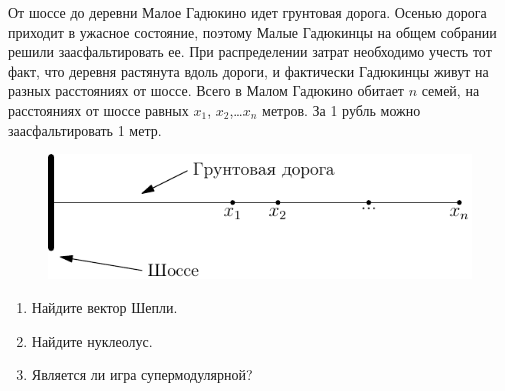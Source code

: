 \begin{problem}
От шоссе до деревни Малое Гадюкино идет грунтовая дорога. Осенью дорога приходит в ужасное состояние, поэтому Малые Гадюкинцы на общем собрании решили заасфальтировать ее. При распределении затрат необходимо учесть тот факт, что деревня растянута вдоль дороги, и фактически Гадюкинцы живут на разных расстояниях от шоссе. Всего в Малом Гадюкино обитает  $n$  семей, на расстояниях от шоссе равных  $x_{1}$,  $x_{2}$,\ldots  $x_{n}$ метров. За 1 рубль можно заасфальтировать 1 метр.

\begin{figure}[htbp]
	\includegraphics{coop_gadukino.pdf}
\end{figure}

\begin{enumerate}
\item Найдите вектор Шепли.
\item Найдите нуклеолус.
\item Является ли игра супермодулярной?
\end{enumerate}



\begin{sol}

\end{sol}
\end{problem}




